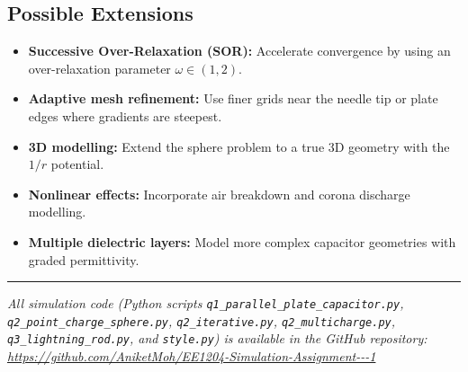 \documentclass[11pt,a4paper]{article}
\begin{document}
\subsection{Possible Extensions}
\begin{itemize}[leftmargin=2em]
\item \textbf{Successive Over-Relaxation (SOR):} Accelerate convergence by using an over-relaxation parameter $\omega \in (1,2)$.
\item \textbf{Adaptive mesh refinement:} Use finer grids near the needle tip or plate edges where gradients are steepest.
\item \textbf{3D modelling:} Extend the sphere problem to a true 3D geometry with the $1/r$ potential.
\item \textbf{Nonlinear effects:} Incorporate air breakdown and corona discharge modelling.
\item \textbf{Multiple dielectric layers:} Model more complex capacitor geometries with graded permittivity.
\end{itemize}

\vspace{1cm}
\noindent\rule{\textwidth}{0.5pt}
\begin{center}
\small\itshape
All simulation code (Python scripts \texttt{q1\_parallel\_plate\_capacitor.py}, \texttt{q2\_point\_charge\_sphere.py}, \texttt{q2\_iterative.py}, \texttt{q2\_multicharge.py}, \texttt{q3\_lightning\_rod.py}, and \texttt{style.py}) is available in the GitHub repository:\\[3mm]
\url{https://github.com/AniketMoh/EE1204-Simulation-Assignment---1}\\[2mm]
\end{center}
\end{document}

